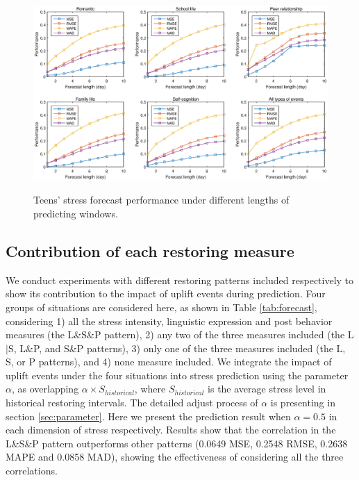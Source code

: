 \begin{figure}
\centering
\caption{Teens' stress forecast performance under different lengths of predicting windows.}
\includegraphics[width=\linewidth]{figs/predictWindow2.eps}
\label{fig:length}
\end{figure}

\subsection{Contribution of each restoring measure}
We conduct experiments with different restoring patterns included respectively to show
its contribution to the impact of uplift events during prediction.
Four groups of situations are considered here, as shown in Table \ref{tab:forecast},
considering
1) all the stress intensity, linguistic expression and post behavior measures (the L\&S\&P pattern),
2) any two of the three measures included (the L$|$S, L\&P, and S\&P patterns),
3) only one of the three measures included (the L, S, or P patterns),
and 4) none measure included.
We integrate the impact of uplift events under the four situations into stress prediction
using the parameter $\alpha$,
as overlapping $\alpha \times S_{historical}$,
where $S_{historical}$ is the average stress level in historical restoring intervals.
The detailed adjust process of $\alpha$  is presenting in section \ref{sec:parameter}.
Here we present the prediction result when $\alpha = 0.5$ in each dimension of stress respectively.
Results show that the correlation in the L\&S\&P pattern outperforms other patterns
(0.0649 MSE, 0.2548 RMSE, 0.2638 MAPE and 0.0858 MAD),
showing the effectiveness of considering all the three correlations.

